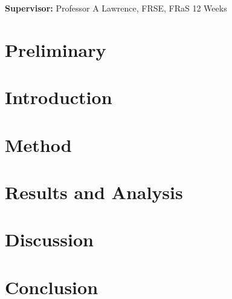 \documentclass[a4paper,11pt]{article}
\begin{document}
\vfill
{\bf Supervisor:} Professor A Lawrence, FRSE, FRaS
\hfill
12 Weeks

\newpage
\setcounter{page}{1}                            %
\tableofcontents                                %
\section{Preliminary}
\section{Introduction}
\section{Method}
\section{Results and Analysis}
\section{Discussion}
\section{Conclusion}

\printbibliography
\end{document}
